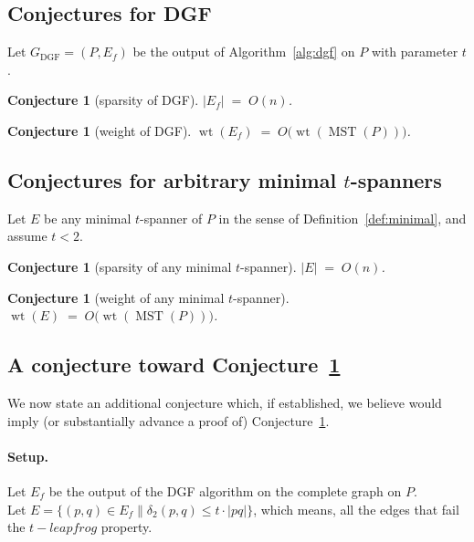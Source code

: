 \documentclass{article}
\newtheorem{conjecture}[theorem]{Conjecture}
\DeclareMathOperator{\wt}{wt}
\DeclareMathOperator{\MST}{MST}
\begin{document}
\subsection{Conjectures for DGF}
Let $G_{\mathrm{DGF}}=(P,E_f)$ be the output of Algorithm~\ref{alg:dgf}
on $P$ with parameter $t$.

\begin{conjecture}[sparsity of DGF]\label{conj:dgf-edges}
$|E_f| \;=\; O(n)$.
\end{conjecture}

\begin{conjecture}[weight of DGF]\label{conj:dgf-weight}
$\wt(E_f) \;=\; O\!\bigl(\wt(\MST(P))\bigr)$.
\end{conjecture}

\subsection{Conjectures for arbitrary minimal \texorpdfstring{$t$}{t}-spanners}
Let $E$ be any minimal $t$-spanner of $P$ in the sense of
Definition~\ref{def:minimal}, and assume $t < 2$.

\begin{conjecture}[sparsity of any minimal $t$-spanner]\label{conj:min-edges}
$|E| \;=\; O(n)$.
\end{conjecture}

\begin{conjecture}[weight of any minimal $t$-spanner]\label{conj:min-weight}
$\wt(E) \;=\; O\!\bigl(\wt(\MST(P))\bigr)$.
\end{conjecture}

\subsection{A conjecture toward Conjecture~\ref{conj:min-weight}}
\label{subsec:toward-min-weight}
We now state an additional conjecture which, if established, we believe
would imply (or substantially advance a proof of)
Conjecture~\ref{conj:min-weight}.


\paragraph{Setup.}
Let $E_f$ be the output of the DGF algorithm on the complete graph on $P$.\\
Let $E = \{(p,q) \in E_f \| \delta_2(p,q) \leq t \cdot |pq|\}$, 
which means, 
all the edges that fail the $t-leapfrog$ property.\\
\end{document}
